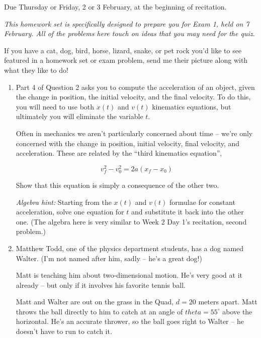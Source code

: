 \documentclass[12pt]{article}
\begin{document}
\Large
\centerline{}


\begin{center} \normalsize Due Thursday or Friday, 2 or 3 February, at the beginning of recitation. 
\end{center}
\normalsize

\it This homework set is specifically designed to prepare you for Exam 1, held on 7 February. All of the problems here touch on ideas that you may need for the quiz. 

If you have a cat, dog, bird, horse, lizard, snake, or pet rock you'd like to see featured in a homework set or exam problem, send me their picture along with what they like to do!

\rm
\begin{enumerate}

\item Part 4 of Question 2 asks you to compute the acceleration of an object, given the change in position, the initial velocity, and the final velocity. To do this, you will need to use both $x(t)$ and $v(t)$ kinematics equations, but ultimately you will eliminate the variable $t$.

Often in mechanics we aren't particularly concerned about time -- we're only concerned with the change in position, initial velocity, final velocity, and acceleration.
These are related by the ``third kinematics equation'', 

$$
v_f^2 - v_0^2 = 2a(x_f - x_0)
$$

Show that this equation is simply a consequence of the other two.

{\it Algebra hint:} Starting from the $x(t)$ and $v(t)$ formulae for constant acceleration, solve one equation for $t$ and substitute it back into the other one. (The algebra here is very similar to Week 2 Day 1's recitation, second problem.)

\bigskip

\item Matthew Todd, one of the physics department students, has a dog named Walter. (I'm not named after him, sadly -- he's a great dog!) 

\begin{minipage}{0.55\textwidth}Matt is teaching him about two-dimensional motion. He's very good at it already -- but only if it involves his favorite tennis ball.

\bigskip

Matt and Walter are out on the grass in the Quad, $d=20$ meters apart. Matt throws the ball directly to him to catch at an angle of $theta=55^\circ$ above the horizontal. He's an accurate thrower, so the ball goes right to Walter -- he doesn't have to run to catch it. 


\end{minipage}
\end{enumerate}
\end{document}
